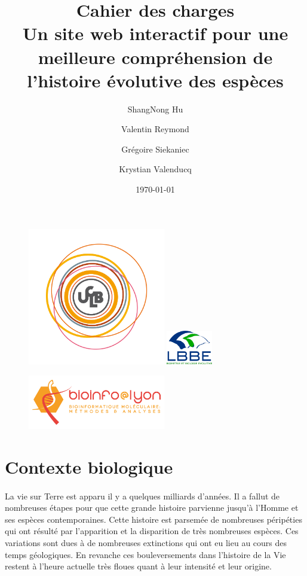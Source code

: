 \documentclass[a4paper]{article}
\title{{\sc \large Cahier des charges}\\
\bf Un site web interactif pour une meilleure compréhension de l’histoire évolutive des espèces}
\author{ShangNong {\sc Hu}\and Valentin {\sc Reymond}\and Grégoire {\sc Siekaniec}\and Krystian {\sc Valenducq}}
\date\today
\begin{document}
\begin{figure}[!t]
	\centering
	\includegraphics[width=6cm]{ucbl.png}
	\hspace{\fill}
	\includegraphics[width=2cm]{lbbe.png}
\end{figure}

\maketitle
\thispagestyle{empty}

\begin{figure}[!b]
	\centering
	\includegraphics[width=6cm]{logo.png}
\end{figure}

\newpage

\tableofcontents
\newpage


\section{Contexte biologique}
	\paragraph{}
	La vie sur Terre est apparu il y a quelques milliards d'années. Il a fallut de nombreuses étapes pour que cette grande histoire parvienne jusqu'à l'Homme et ses espèces contemporaines. Cette histoire est parsemée de nombreuses péripéties qui ont résulté par l'apparition et la disparition de très nombreuses espèces. Ces variations sont dues à de nombreuses extinctions qui ont eu lieu au cours des temps géologiques. En revanche ces bouleversements dans l'histoire de la Vie restent à l'heure actuelle très floues quant à leur intensité et leur origine.
\end{document}
